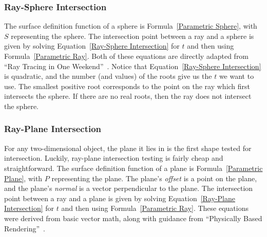 \subsubsection{Ray-Sphere Intersection}

The surface definition function of a sphere is Formula~\ref{Parametric Sphere}, with $S$ representing the sphere.
The intersection point between a ray and a sphere is given by solving Equation~\ref{Ray-Sphere Intersection} for $t$ and then using Formula~\ref{Parametric Ray}.
Both of these equations are directly adapted from ``Ray Tracing in One Weekend''~\cite{shirley2016ray}.
Notice that Equation~\ref{Ray-Sphere Intersection} is quadratic, and the number (and values) of the roots give us the $t$ we want to use.
The smallest positive root corresponds to the point on the ray which first intersects the sphere.
If there are no real roots, then the ray does not intersect the sphere.



\subsubsection{Ray-Plane Intersection}

For any two-dimensional object, the plane it lies in is the first shape tested for intersection.
Luckily, ray-plane intersection testing is fairly cheap and straightforward.
The surface definition function of a plane is Formula~\ref{Parametric Plane}, with $P$ representing the plane.
The plane's {\it offset\/} is a point on the plane, and the plane's {\it normal\/} is a vector perpendicular to the plane.
The intersection point between a ray and a plane is given by solving Equation~\ref{Ray-Plane Intersection} for $t$ and then using Formula~\ref{Parametric Ray}.
These equations were derived from basic vector math, along with guidance from ``Physically Based Rendering''~\cite{pharr2016physically}.



